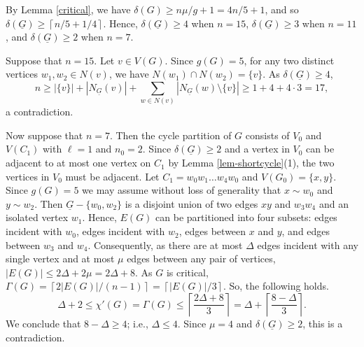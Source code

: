 \documentclass[12pt,oneside]{amsart}
\newcommand\roundup[1]{\left\lceil#1\right\rceil}
\begin{document}
By Lemma \ref{critical},  we have $\delta(G)\geq n\mu/g+1=4n/5+1$, and so $\delta(\underline{G})\geq \roundup{n/5+1/4}$.
Hence,  $\delta(\underline{G})\geq 4$ when $n=15$, $\delta(\underline{G})\geq 3$ when $n=11$, and $\delta(\underline{G})\geq 2$ when $n=7$.


Suppose that $n=15$. Let $v\in V(G)$. Since $g(G) =5$, for any two distinct vertices $w_1, w_2\in N(v)$, we have $N(w_1)\cap N(w_2) =\{v\}$.  As $\delta(\underline{G})\geq 4$,
\[
n \ge |\{v\}| + |N_{\underline{G}}(v)| +\sum_{w\in N(v)} |N_{\underline{G}}(w)\setminus\{v\} | \ge 1+4 +4\cdot 3=17,
\]
a contradiction.


Now suppose that $n=7$. Then the cycle partition of $G$ consists of $V_0$ and $V(C_1)$ with $\ell=1$ and $n_0=2$. Since $\delta(\underline{G})\geq 2$ and a vertex in $V_0$ can be adjacent to at most one vertex on $C_1$ by Lemma \ref{lem-shortcycle}(1),  the two vertices in $V_0$ must be adjacent. Let $C_1=w_0w_1 \dots w_4w_0$ and $V(G_0) = \{x,y\}$. Since $g(G)=5$ we may assume without loss of generality that $x\sim w_0$ and $y\sim w_2$. Then $\underline{G}-\{w_0, w_2\}$ is a disjoint union of two edges $xy$ and $w_3w_4$ and an isolated vertex $w_1$. Hence, $E(G)$ can be partitioned into four subsets: edges incident with $w_0$, edges incident with $w_2$, edges between $x$ and $y$, and edges between $w_3$ and $w_4$. Consequently, as there are at most $\Delta$ edges incident with any single vertex and at most $\mu$ edges between any pair of vertices, $|E(G)| \le 2\Delta + 2\mu = 2\Delta +8$.
As $G$ is critical, $\Gamma(G) = \roundup{2|E(G)|/(n-1)}=\roundup{|E(G)|/3}$. So, the following holds.
\[
\Delta + 2 \leq \chi'(G) =\Gamma(G) \le   \roundup{\frac{2\Delta +8}{3}} = \Delta +\roundup{\frac{8 -\Delta}3}.
\]
We conclude that $8 -\Delta \ge 4$; i.e., $\Delta \leq 4$. Since $\mu=4$ and $\delta(\underline{G}) \ge 2$, this is a contradiction.
\end{document}
